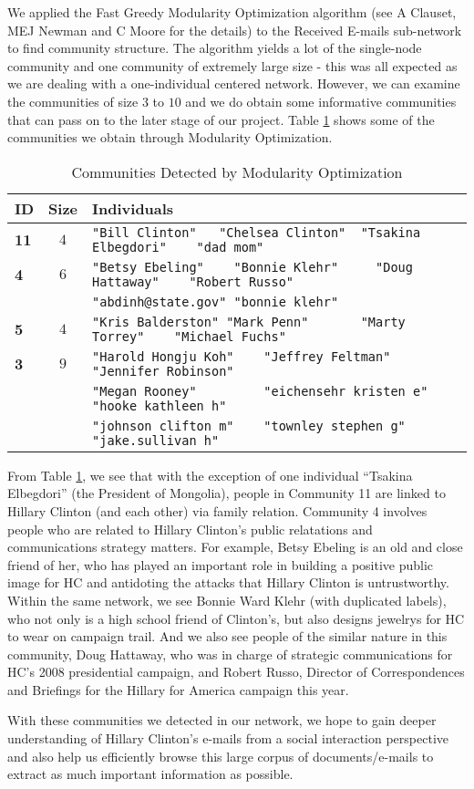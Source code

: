 We applied the Fast Greedy Modularity Optimization algorithm (see A Clauset, MEJ Newman and C Moore \cite{greedy_mod} for the details) to the Received E-mails sub-network to find community structure. The algorithm yields a lot of the single-node community and one community of extremely large size - this was all expected as we are dealing with a one-individual centered network. However, we can examine the communities of size $3$ to $10$ and we do obtain some informative communities that can pass on to the later stage of our project. Table \ref{tab:greedy} shows some of the communities we obtain through Modularity Optimization.
\begin{table}
\caption{Communities Detected by Modularity Optimization}
\label{tab:greedy}
\centering
\begin{tabular}{|l |c| l|}\hline
{\bf ID} & \bf Size & \bf Individuals \\ \hline \hline
\bf 11 & $4$ & \verb+"Bill Clinton"   "Chelsea Clinton"  "Tsakina Elbegdori"    "dad mom"+ \\ \hline
\bf 4 & $6$ & \verb+"Betsy Ebeling"    "Bonnie Klehr"     "Doug Hattaway"    "Robert Russo"+\\
&& \verb+"abdinh@state.gov" "bonnie klehr"+\\ \hline
{\bf 5} & $4$ &\verb+"Kris Balderston" "Mark Penn"       "Marty Torrey"    "Michael Fuchs"+\\ \hline
{\bf 3} & $9$ & \verb+"Harold Hongju Koh"    "Jeffrey Feltman"      "Jennifer Robinson"+\\
&& \verb+"Megan Rooney"         "eichensehr kristen e" "hooke kathleen h"+\\
&& \verb+"johnson clifton m"    "townley stephen g"    "jake.sullivan h"+ \\
\hline 
\end{tabular}
\end{table}

From Table \ref{tab:greedy}, we see that with the exception of one individual ``Tsakina Elbegdori'' (the President of Mongolia), people in Community 11 are linked to Hillary Clinton (and each other) via family relation. Community 4 involves people who are related to Hillary Clinton's public relatations and communications strategy matters. For example, Betsy Ebeling is an old and close friend of her, who has played an important role in building a positive public image for HC and antidoting the attacks that Hillary Clinton is untrustworthy. Within the same network, we see Bonnie Ward Klehr (with duplicated labels), who not only is a high school friend of Clinton's, but also designs jewelrys for HC to wear on campaign trail. And we also see people of the similar nature in this community, Doug Hattaway, who was in charge of strategic communications for HC's 2008 presidential campaign, and Robert Russo, Director of Correspondences and Briefings for the Hillary for America campaign this year. 

With these communities we detected in our network, we hope to gain deeper understanding of Hillary Clinton's e-mails from a social interaction perspective and also help us efficiently browse this large corpus of documents/e-mails to extract as much important information as possible. 